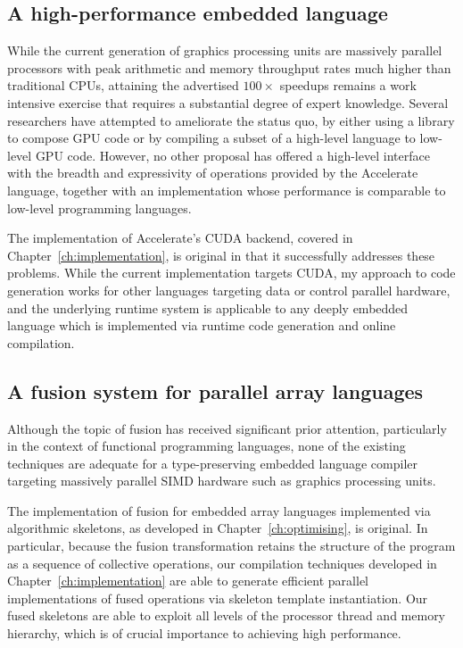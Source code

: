 \subsection{A high-performance embedded language}

While the current generation of graphics processing units are massively parallel
processors with peak arithmetic and memory throughput rates much higher than
traditional CPUs, attaining the advertised $100\times$ speedups remains a work
intensive exercise that requires a substantial degree of expert knowledge.
Several researchers have attempted to ameliorate the status quo, by either using
a library to compose GPU code or by compiling a subset of a high-level language
to low-level GPU code. However, no other proposal has offered a high-level
interface with the breadth and expressivity of operations provided by the
Accelerate language, together with an implementation whose performance is
comparable to low-level programming languages.


The implementation of Accelerate's CUDA backend, covered in
Chapter~\ref{ch:implementation}, is original in that it successfully addresses
these problems. While the current implementation targets CUDA, my approach to
code generation works for other languages targeting data or control parallel
hardware, and the underlying runtime system is applicable to any deeply embedded
language which is implemented via runtime code generation and online
compilation.


\subsection{A fusion system for parallel array languages}

Although the topic of fusion has received significant prior attention,
particularly in the context of functional programming languages, none of the
existing techniques are adequate for a type-preserving embedded language
compiler targeting massively parallel SIMD hardware such as graphics processing
units.

The implementation of fusion for embedded array languages implemented via
algorithmic skeletons, as developed in Chapter~\ref{ch:optimising}, is original.
In particular, because the fusion transformation retains the structure of the
program as a sequence of collective operations, our compilation techniques
developed in Chapter~\ref{ch:implementation} are able to generate efficient
parallel implementations of fused operations via skeleton template
instantiation. Our fused skeletons are able to exploit all levels of the
processor thread and memory hierarchy, which is of crucial importance to
achieving high performance.


